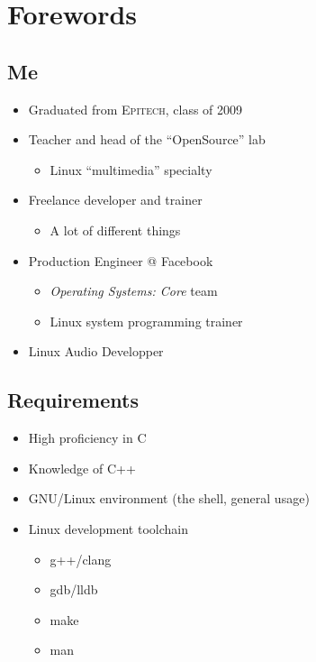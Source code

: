 \section*{Forewords}
\label{sec:forewords}

\subsection*{Me}
\begin{frame}
  \begin{itemize}
  \item Graduated from \textsc{Epitech}, class of 2009
  \item Teacher and head of the ``OpenSource'' lab
    \begin{itemize}
    \item Linux ``multimedia'' specialty
    \end{itemize}
  \item Freelance developer and trainer
    \begin{itemize}
    \item A lot of different things
    \end{itemize}
  \item Production Engineer @ Facebook
    \begin{itemize}
    \item \emph{Operating Systems: Core} team
    \item Linux system programming trainer
    \end{itemize}
  \item Linux Audio Developper
  \end{itemize}
\end{frame}


\subsection*{Requirements}
\begin{frame}
  \begin{itemize}
  \item High proficiency in C
  \item Knowledge of C++
  \item GNU/Linux environment (the shell, general usage)
  \item Linux development toolchain
    \begin{itemize}
    \item g++/clang
    \item gdb/lldb
    \item make
    \item man
    \end{itemize}
  \end{itemize}
\end{frame}



